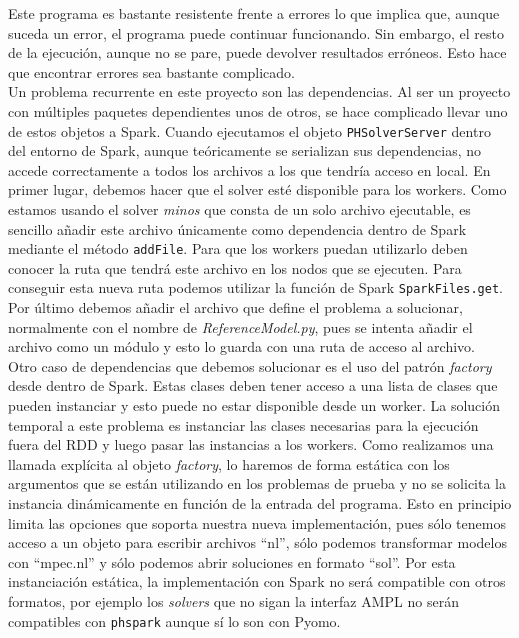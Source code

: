 Este programa es bastante resistente frente a errores lo que implica que, aunque suceda un error, el programa puede continuar funcionando. Sin embargo, el resto de la ejecución, aunque no se pare, puede devolver resultados erróneos. Esto hace que encontrar errores sea bastante complicado.\\

Un problema recurrente en este proyecto son las dependencias. Al ser un proyecto con múltiples paquetes dependientes unos de otros, se hace complicado llevar uno de estos objetos a Spark. Cuando ejecutamos el objeto \texttt{PHSolverServer} dentro del entorno de Spark, aunque teóricamente se serializan sus dependencias, no accede correctamente a todos los archivos a los que tendría acceso en local.
En primer lugar, debemos hacer que el solver esté disponible para los workers. Como estamos usando el solver \textit{minos} que consta de un solo archivo ejecutable, es sencillo añadir este archivo únicamente como dependencia dentro de Spark mediante el método \texttt{addFile}. Para que los workers puedan utilizarlo deben conocer la ruta que tendrá este archivo en los nodos que se ejecuten. Para conseguir esta nueva ruta podemos utilizar la función de Spark \texttt{SparkFiles.get}. Por último debemos añadir el archivo que define el problema a solucionar, normalmente con el nombre de \textit{ReferenceModel.py}, pues se intenta añadir el archivo como un módulo y esto lo guarda con una ruta de acceso al archivo.\\

Otro caso de dependencias que debemos solucionar es el uso del patrón \textit{factory} desde dentro de Spark. Estas clases deben tener acceso a una lista de clases que pueden instanciar y esto puede no estar disponible desde un worker. La solución temporal a este problema es instanciar las clases necesarias para la ejecución fuera del RDD y luego pasar las instancias a los workers. Como realizamos una llamada explícita al objeto \textit{factory}, lo haremos de forma estática con los argumentos que se están utilizando en los problemas de prueba y no se solicita la instancia dinámicamente en función de la entrada del programa. Esto en principio limita las opciones que soporta nuestra nueva implementación, pues sólo tenemos acceso a un objeto para escribir archivos ``nl'', sólo podemos transformar modelos con ``mpec.nl'' y sólo podemos abrir soluciones en formato ``sol''. Por esta instanciación estática, la implementación con Spark no será compatible con otros formatos, por ejemplo los \textit{solvers} que no sigan la interfaz AMPL no serán compatibles con \texttt{phspark} aunque sí lo son con Pyomo.\\


